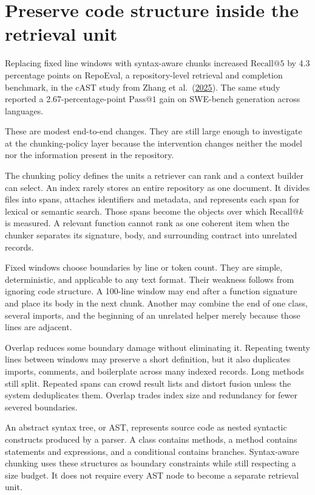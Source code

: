 \hypertarget{preserve-code-structure-inside-the-retrieval-unit}{%
\section{Preserve code structure inside the retrieval unit}\label{preserve-code-structure-inside-the-retrieval-unit}}

Replacing fixed line windows with syntax-aware chunks increased \(\mathrm{Recall}@5\) by 4.3 percentage points on RepoEval, a repository-level retrieval and completion benchmark, in the cAST study from Zhang et al.~(\href{https://arxiv.org/abs/2506.15655}{2025}). The same study reported a 2.67-percentage-point \(\mathrm{Pass}@1\) gain on SWE-bench generation across languages.

These are modest end-to-end changes. They are still large enough to investigate at the chunking-policy layer because the intervention changes neither the model nor the information present in the repository.

The chunking policy defines the units a retriever can rank and a context builder can select. An index rarely stores an entire repository as one document. It divides files into spans, attaches identifiers and metadata, and represents each span for lexical or semantic search. Those spans become the objects over which \(\mathrm{Recall}@k\) is measured. A relevant function cannot rank as one coherent item when the chunker separates its signature, body, and surrounding contract into unrelated records.

Fixed windows choose boundaries by line or token count. They are simple, deterministic, and applicable to any text format. Their weakness follows from ignoring code structure. A 100-line window may end after a function signature and place its body in the next chunk. Another may combine the end of one class, several imports, and the beginning of an unrelated helper merely because those lines are adjacent.

Overlap reduces some boundary damage without eliminating it. Repeating twenty lines between windows may preserve a short definition, but it also duplicates imports, comments, and boilerplate across many indexed records. Long methods still split. Repeated spans can crowd result lists and distort fusion unless the system deduplicates them. Overlap trades index size and redundancy for fewer severed boundaries.

An abstract syntax tree, or AST, represents source code as nested syntactic constructs produced by a parser. A class contains methods, a method contains statements and expressions, and a conditional contains branches. Syntax-aware chunking uses these structures as boundary constraints while still respecting a size budget. It does not require every AST node to become a separate retrieval unit.

